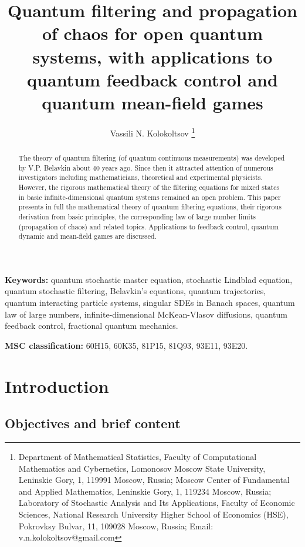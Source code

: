 \documentclass[12pt]{article}
\begin{document}
\title{Quantum filtering and propagation of chaos for open quantum systems,
with applications to quantum feedback control and quantum mean-field games}



\author{Vassili N. Kolokoltsov
\thanks{Department of Mathematical Statistics, Faculty of Computational Mathematics and Cybernetics,
Lomonosov Moscow State University, Leninskie Gory, 1, 119991 Moscow, Russia;
Moscow Center of Fundamental and Applied Mathematics, Leninskie Gory, 1, 119234 Moscow, Russia;
Laboratory of Stochastic Analysis and Its Applications, Faculty of Economic Sciences, National Research
University Higher School of Economics (HSE), Pokrovksy Bulvar, 11, 109028 Moscow, Russia;
Email: v.n.kolokoltsov@gmail.com}}
\maketitle

\begin{abstract}
The theory of quantum filtering (of quantum continuous measurements) was developed
by V.P. Belavkin about 40 years ago. Since then it attracted attention of numerous
investigators including mathematicians, theoretical and experimental physicists.
However, the rigorous mathematical theory of the filtering equations for mixed
states in basic infinite-dimensional quantum systems
remained an open problem. This paper presents in full the mathematical
theory of quantum filtering equations, their rigorous derivation from
basic principles, the corresponding law of large number limits (propagation of chaos)
and related topics. Applications to feedback control, quantum dynamic and mean-field games
are discussed.
\end{abstract}

{\bf Keywords:} quantum stochastic master equation, stochastic Lindblad equation,
quantum stochastic filtering, Belavkin's equations, quantum trajectories,
quantum interacting particle systems, singular SDEs in Banach spaces,  quantum law of large numbers,
infinite-dimensional McKean-Vlasov diffusions, quantum feedback control, fractional quantum mechanics.

{\bf MSC classification:} 60H15, 60K35, 81P15, 81Q93, 93E11, 93E20.


\section{Introduction}

\subsection{Objectives and brief content}
\end{document}

